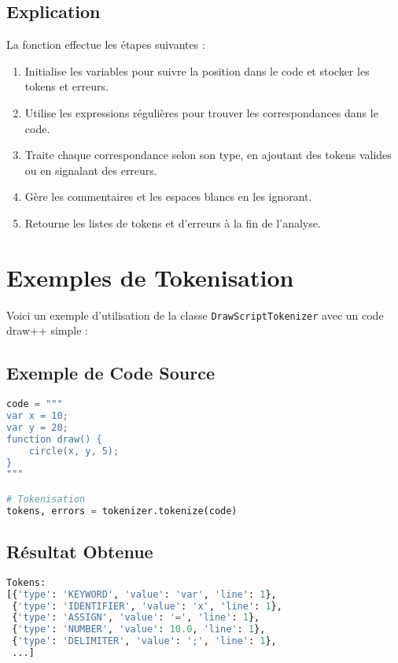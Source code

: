 \documentclass[12pt]{article}
\begin{document}
\subsection*{Explication}
La fonction effectue les étapes suivantes :
\begin{enumerate}
    \item Initialise les variables pour suivre la position dans le code et stocker les tokens et erreurs.
    \item Utilise les expressions régulières pour trouver les correspondances dans le code.
    \item Traite chaque correspondance selon son type, en ajoutant des tokens valides ou en signalant des erreurs.
    \item Gère les commentaires et les espaces blancs en les ignorant.
    \item Retourne les listes de tokens et d'erreurs à la fin de l'analyse.
\end{enumerate}

\section{Exemples de Tokenisation}
Voici un exemple d'utilisation de la classe \texttt{DrawScriptTokenizer} avec un code draw++ simple :

\subsection*{Exemple de Code Source}
\begin{lstlisting}[language=Python, caption={Code draw++ d'exemple}]
code = """
var x = 10;
var y = 20;
function draw() {
    circle(x, y, 5);
}
"""

# Tokenisation
tokens, errors = tokenizer.tokenize(code)
\end{lstlisting}

\subsection*{Résultat Obtenue}
\begin{lstlisting}[language=Python, caption={Résultats de la tokenisation}]
Tokens:
[{'type': 'KEYWORD', 'value': 'var', 'line': 1},
 {'type': 'IDENTIFIER', 'value': 'x', 'line': 1},
 {'type': 'ASSIGN', 'value': '=', 'line': 1},
 {'type': 'NUMBER', 'value': 10.0, 'line': 1},
 {'type': 'DELIMITER', 'value': ';', 'line': 1},
 ...]
\end{lstlisting}
\end{document}
